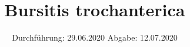 

\subject{TPS Praktikum}
\title{Bursitis trochanterica}
\date{%
  Durchführung: 29.06.2020
  \hspace{3em}
  Abgabe: 12.07.2020
}



\maketitle
\thispagestyle{empty}
\tableofcontents
\newpage





\newpage

\printbibliography{}
\nocite{*}


